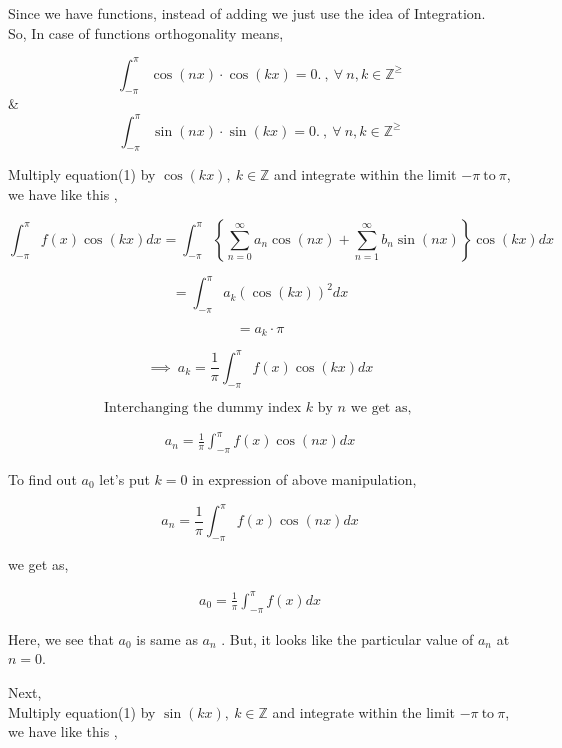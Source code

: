 \documentclass[a4paper,12pt]{article}
\begin{document}
        \begin{tcolorbox}
            Since we have functions, instead of adding we just use the idea of Integration.\\
            So, In case of functions orthogonality means,

        $$\int_{-\pi}^{\pi}\cos\left(nx\right)\cdot \cos\left(kx\right) = 0.\ ,\ \forall\ n , k \in \mathbb{Z^\geq}$$
        \& 
        $$\int_{-\pi}^{\pi}\sin\left(nx\right)\cdot \sin\left(kx\right) = 0.\ ,\ \forall\ n , k \in \mathbb{Z^\geq}$$
        
        \end{tcolorbox}

        Multiply equation(1) by $\cos(kx) ,\ k\in \mathbb{Z}$ and integrate within the limit $-\pi\ \mbox{to}\ \pi$, we have like this ,

        $$\int_{-\pi}^{\pi}f(x)\cos(kx)dx  = \int_{-\pi}^{\pi}\left\{\sum_{n=0}^{\infty}a_{n}\cos(nx) + \sum_{n=1}^{\infty}b_{n}\sin(nx)\right\}\cos(kx)dx$$

        $$= \int_{-\pi}^{\pi}a_{k}\left(\cos(kx)\right)^2dx$$

        $$= a_{k}\cdot \pi$$

        $$\implies\ a_{k}  =  \frac{1}{\pi}\int_{-\pi}^{\pi}f(x)\cos(kx)dx$$

        $$\mbox{Interchanging the dummy index $k$ by $n$ we get as, }$$

        \begin{align*}
            \boxed{a_{n}  =  \frac{1}{\pi}\int_{-\pi}^{\pi}f(x)\cos(nx)dx}
        \end{align*}

        To find out $a_{0}$ let's put $k=0$ in expression of above manipulation,

        $$a_{n}  =  \frac{1}{\pi}\int_{-\pi}^{\pi}f(x)\cos(nx)dx$$

        we get as,


        \begin{align*}
            \boxed{a_{0}  = \frac{1}{\pi}\int_{-\pi}^{\pi}f(x)dx}
        \end{align*}

        Here, we see that $a_{0}$ is same as $a_{n}$ . But, it looks like the particular value of $a_{n}$ at $n=0$.

        \pagebreak

        Next,\\

        Multiply equation(1) by $\sin(kx) ,\ k\in \mathbb{Z}$ and integrate within the limit $-\pi\ \mbox{to}\ \pi$, we have like this ,
\end{document}
